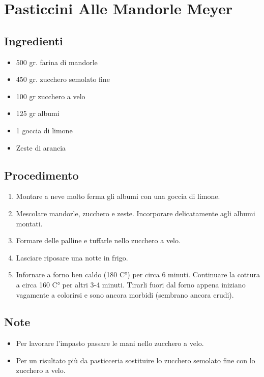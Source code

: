 \section{Pasticcini Alle Mandorle Meyer}
\subsection{Ingredienti}
\begin{itemize}
\item 500 gr. farina di mandorle  
\item 450 gr. zucchero semolato fine   
\item 100 gr zucchero a velo  
\item 125 gr albumi  
\item 1 goccia di limone  
\item Zeste di arancia
\end{itemize}
\subsection{Procedimento}
\begin{enumerate}
\item  Montare a neve molto ferma gli albumi con una goccia di limone.  
\item  Mescolare mandorle, zucchero e zeste. Incorporare delicatamente agli albumi montati.  
\item  Formare delle palline e tuffarle nello zucchero a velo.  
\item  Lasciare riposare una notte in frigo.  
\item  Infornare a forno ben caldo (180 C°) per circa 6 minuti. Continuare la cottura a circa 160 C° per altri 3-4 minuti. Tirarli fuori dal forno appena iniziano vagamente a colorirsi e sono ancora morbidi (sembrano ancora crudi).
\end{enumerate}
\subsection{Note}
\begin{itemize}
\item Per lavorare l'impasto passare le mani nello zucchero a velo.  
\item Per un risultato più da pasticceria sostituire lo zucchero semolato fine con lo zucchero a velo.
\end{itemize}
